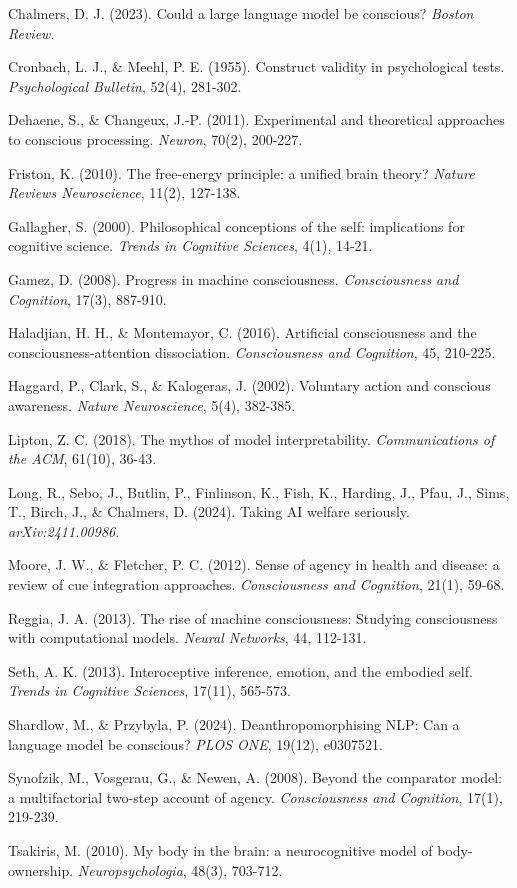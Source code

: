 \documentclass[
  11pt,
  letterpaper,
]{article}
\begin{document}
Chalmers, D. J. (2023). Could a large language model be conscious?
\emph{Boston Review}.

Cronbach, L. J., \& Meehl, P. E. (1955). Construct validity in
psychological tests. \emph{Psychological Bulletin}, 52(4), 281-302.

Dehaene, S., \& Changeux, J.-P. (2011). Experimental and theoretical
approaches to conscious processing. \emph{Neuron}, 70(2), 200-227.

Friston, K. (2010). The free-energy principle: a unified brain theory?
\emph{Nature Reviews Neuroscience}, 11(2), 127-138.

Gallagher, S. (2000). Philosophical conceptions of the self:
implications for cognitive science. \emph{Trends in Cognitive Sciences},
4(1), 14-21.

Gamez, D. (2008). Progress in machine consciousness. \emph{Consciousness
and Cognition}, 17(3), 887-910.

Haladjian, H. H., \& Montemayor, C. (2016). Artificial consciousness and
the consciousness-attention dissociation. \emph{Consciousness and
Cognition}, 45, 210-225.

Haggard, P., Clark, S., \& Kalogeras, J. (2002). Voluntary action and
conscious awareness. \emph{Nature Neuroscience}, 5(4), 382-385.

Lipton, Z. C. (2018). The mythos of model interpretability.
\emph{Communications of the ACM}, 61(10), 36-43.

Long, R., Sebo, J., Butlin, P., Finlinson, K., Fish, K., Harding, J.,
Pfau, J., Sims, T., Birch, J., \& Chalmers, D. (2024). Taking AI welfare
seriously. \emph{arXiv:2411.00986}.

Moore, J. W., \& Fletcher, P. C. (2012). Sense of agency in health and
disease: a review of cue integration approaches. \emph{Consciousness and
Cognition}, 21(1), 59-68.

Reggia, J. A. (2013). The rise of machine consciousness: Studying
consciousness with computational models. \emph{Neural Networks}, 44,
112-131.

Seth, A. K. (2013). Interoceptive inference, emotion, and the embodied
self. \emph{Trends in Cognitive Sciences}, 17(11), 565-573.

Shardlow, M., \& Przybyla, P. (2024). Deanthropomorphising NLP: Can a
language model be conscious? \emph{PLOS ONE}, 19(12), e0307521.

Synofzik, M., Vosgerau, G., \& Newen, A. (2008). Beyond the comparator
model: a multifactorial two-step account of agency. \emph{Consciousness
and Cognition}, 17(1), 219-239.

Tsakiris, M. (2010). My body in the brain: a neurocognitive model of
body-ownership. \emph{Neuropsychologia}, 48(3), 703-712.
\end{document}
